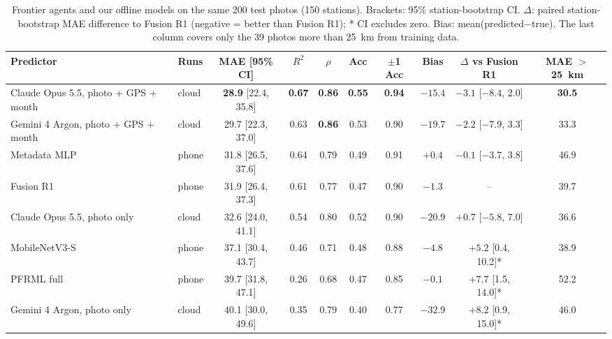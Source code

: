 \documentclass[conference]{IEEEtran}
\begin{document}
\begin{table}[!t]
  \centering
  \caption{
    Frontier agents and our offline models on the same 200 test photos (150
    stations). Brackets: 95\% station-bootstrap CI. $\Delta$: paired
    station-bootstrap MAE difference to Fusion R1 (negative = better than Fusion
    R1); * CI excludes zero. Bias: mean(predicted$-$true). The last column
    covers only the 39 photos more than 25~km from training data.
  }
  \label{tab:frontier}
  \setlength{\tabcolsep}{4pt}
  \begin{tabular}{llcccccccc}
    \toprule
    Predictor                            & Runs  &       MAE [95\% CI]        &     $R^2$     &    $\rho$     &      Acc      &  $\pm$1 Acc   &  Bias   & $\Delta$ vs Fusion R1 & MAE $>$25~km  \\
    \midrule
    Claude Opus 5.5, photo + GPS + month & cloud & \textbf{28.9} [22.4, 35.8] & \textbf{0.67} & \textbf{0.86} & \textbf{0.55} & \textbf{0.94} & $-15.4$ & $-3.1$ [$-8.4$, 2.0]  & \textbf{30.5} \\
    Gemini 4 Argon, photo + GPS + month  & cloud &     29.7 [22.3, 37.0]      &     0.63      & \textbf{0.86} &     0.53      &     0.90      & $-19.7$ & $-2.2$ [$-7.9$, 3.3]  &     33.3      \\
    Metadata MLP                         & phone &     31.8 [26.5, 37.6]      &     0.64      &     0.79      &     0.49      &     0.91      & $+0.4$  & $-0.1$ [$-3.7$, 3.8]  &     46.9      \\
    Fusion R1                            & phone &     31.9 [26.4, 37.3]      &     0.61      &     0.77      &     0.47      &     0.90      & $-1.3$  &          --           &     39.7      \\
    Claude Opus 5.5, photo only          & cloud &     32.6 [24.0, 41.1]      &     0.54      &     0.80      &     0.52      &     0.90      & $-20.9$ & $+0.7$ [$-5.8$, 7.0]  &     36.6      \\
    MobileNetV3-S                        & phone &     37.1 [30.4, 43.7]      &     0.46      &     0.71      &     0.48      &     0.88      & $-4.8$  &  $+5.2$ [0.4, 10.2]*  &     38.9      \\
    PFRML full                           & phone &     39.7 [31.8, 47.1]      &     0.26      &     0.68      &     0.47      &     0.85      & $-0.1$  &  $+7.7$ [1.5, 14.0]*  &     52.2      \\
    Gemini 4 Argon, photo only           & cloud &     40.1 [30.0, 49.6]      &     0.35      &     0.79      &     0.40      &     0.77      & $-32.9$ &  $+8.2$ [0.9, 15.0]*  &     46.0      \\

\end{tabular}
\end{table}
\end{document}

